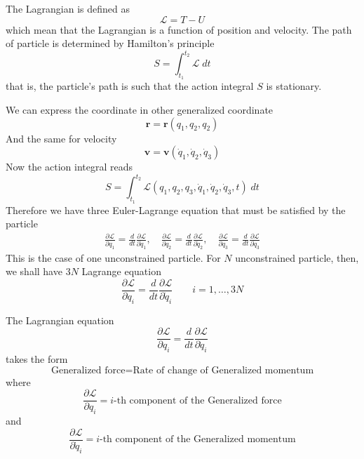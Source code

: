 \documentclass[../../../main.tex]{subfiles}
\begin{document}
The Lagrangian is defined as
\begin{equation*}
  \mathcal{L}=T-U
\end{equation*}
which mean that the Lagrangian is a function of position and velocity.
The path of particle is determined by Hamilton's principle
\begin{equation*}
  S=\int_{t_1}^{t_2}\mathcal{L}\;dt
\end{equation*}
that is, the particle's path is such that the action integral $S$ is stationary.

We can express the coordinate in other generalized coordinate
\begin{equation*}
  \mathbf{r}=\mathbf{r}(q_1,q_2,q_2)
\end{equation*}
And the same for velocity
\begin{equation*}
  \mathbf{v}=\mathbf{v}(\dot{q}_1,\dot{q}_2,\dot{q}_3)
\end{equation*}
Now the action integral reads
\begin{equation*}
  S=\int_{t_1}^{t_2}\mathcal{L}(q_1,q_2,q_3,\dot{q}_1,\dot{q}_2,\dot{q}_3,t)\;dt
\end{equation*}
Therefore we have three Euler-Lagrange equation that must be satisfied by the particle
\begin{align*}
    \frac{\partial \mathcal{L}}{\partial q_1}=\frac{d}{dt}\frac{\partial \mathcal{L}}{\partial \dot{q}_1}, \quad
    \frac{\partial \mathcal{L}}{\partial q_2}=\frac{d}{dt}\frac{\partial \mathcal{L}}{\partial \dot{q}_2}, \quad
    \frac{\partial \mathcal{L}}{\partial q_3}=\frac{d}{dt}\frac{\partial \mathcal{L}}{\partial \dot{q}_3}
\end{align*}
This is the case of one unconstrained particle. For $N$ unconstrained particle, then, we shall have $3N$ Lagrange equation
\begin{equation*}
    \frac{\partial\mathcal{L}}{\partial q_i}=\frac{d}{dt}\frac{\partial \mathcal{L}}{\partial \dot{q}_i}\qquad i=1,\dots,3N
\end{equation*}

The Lagrangian equation 
\begin{equation*}
  \frac{\partial \mathcal{L}}{\partial q_i}=\frac{d}{dt}\frac{\partial \mathcal{L}}{\partial \dot{q}_i}
\end{equation*}
takes the form
\begin{equation*}
    \text{Generalized force}=\text{Rate of change of Generalized momentum}
\end{equation*}
where 
\begin{equation*}
    \frac{\partial \mathcal{L}}{\partial q_i}=i\text{-th component of the Generalized force}
\end{equation*}
and
\begin{equation*}
    \frac{\partial \mathcal{L}}{\partial \dot{q}_i}=i\text{-th component of the Generalized momentum}
\end{equation*}
\end{document}
